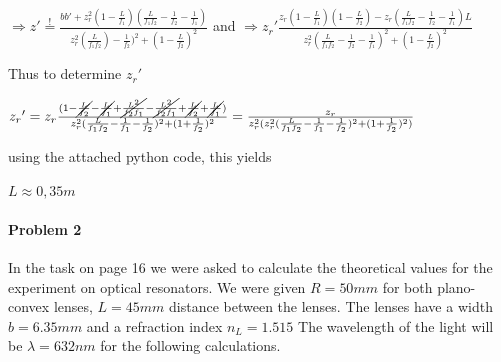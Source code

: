 \documentclass{article}
\newcommand{\mbeq}{\overset{!}{=}}
\begin{document}
$\Rightarrow{} {z}'\mbeq \frac{b{b}'+z_r^2(1-\frac{L}{f_1})(\frac{L}{f_1 f_2}-\frac{1}{f_2}-\frac{1}{f_1})}{z_r^2(\frac{L}{f_1 f_2})-\frac{1}{f_2})^2+(1-\frac{L}{f_2})^2} $
 and
 $\Rightarrow{}{} {z_r}' \frac{z_r(1-\frac{L}{f_1})(1-\frac{L}{f_2})-z_r(\frac{L}{f_1 f_2}-\frac{1}{f_2}-\frac{1}{f_1})L}{z_r^2(\frac{L}{f_1 f_2}-\frac{1}{f_2}-\frac{1}{f_1})^2+(1-\frac{L}{f_2})^2}$
 
 Thus to determine ${z_r}'$
 
 ${z_r}'=z_r\frac{(1-\cancel{\frac{L}{f_2}}-\cancel{\frac{L}{f_1}}+\cancel{\frac{L^2}{f_2 f_1}}-\cancel{\frac{L^2}{f_2 f_1}}+\cancel{\frac{L}{f_2}}+\cancel{\frac{L}{f_1}})}{z_r^2(\frac{L}{f_1 f_2}-\frac{1}{f_1}-\frac{1}{f_2})^2+(1+\frac{1}{f_2})^2}=\frac{z_r}{z_r^2(z_r^2(\frac{L}{f_1 f_2}-\frac{1}{f_1}-\frac{1}{f_2})^2+(1+\frac{1}{f_2})^2)} 
 $
 
 using the attached python code, this yields
 
 $L \approx 0,35 m$


\paragraph{Problem 2}

 In the task on page 16 we were asked to calculate the theoretical values for the experiment on optical resonators. We were given $R=50mm$ for both plano-convex lenses, $L=45mm$ distance between the lenses. The lenses have a width $b=6.35mm$ and a refraction index $n_{L} = 1.515$ The wavelength of the light will be $\lambda = 632nm$ for the following calculations.\\
\\
\end{document}
